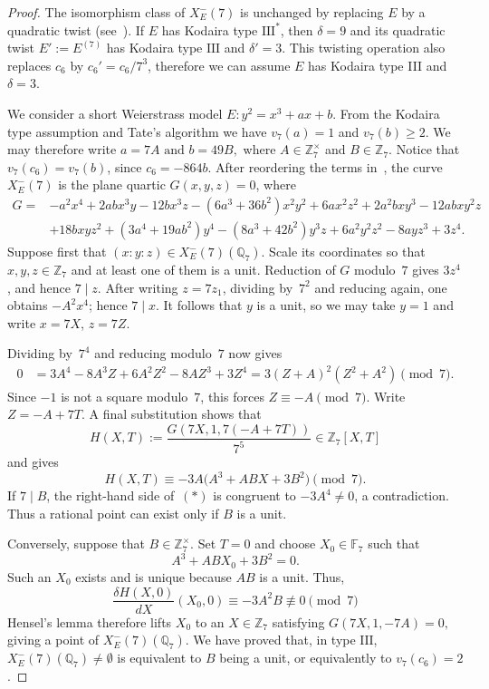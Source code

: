 \documentclass[12pt]{amsart}
\numberwithin{equation}{section}
\theoremstyle{definition}
\newcommand{\F}{\mathbb{F}}
\newcommand{\Q}{\mathbb{Q}}
\newcommand{\Z}{\mathbb{Z}}
\begin{document}
\begin{proof}
The isomorphism class of $X_E^-(7)$ is unchanged by replacing $E$ by a quadratic twist (see~\cite[\S4.5]{PSS}).  
If $E$ has Kodaira type $\mathrm{III}^*$, then $\delta=9$ and its quadratic twist $E' := E^{(7)}$ has Kodaira type $\mathrm{III}$ and $\delta' = 3$. This twisting operation also replaces $c_6$ by $c_6' = c_6/7^3$, therefore we can assume $E$ has Kodaira type III and $\delta = 3$.  

We consider a short Weierstrass model  
\(
 E:y^2=x^3+ax+b.
\)
From the Kodaira type assumption and Tate's algorithm we have $v_7(a)=1$ and $v_7(b)\geq2$.  We may therefore
write
\(
 a=7A\text{ and }b=49B,
 \)
where $A\in\Z_7^\times$ and $B\in\Z_7$.  Notice that
$v_7(c_6)=v_7(b)$, since $c_6=-864b$.
After reordering the terms in~\cite[(7.6)]{PSS}, the curve $X_E^-(7)$ is the plane
quartic $G(x,y,z)=0$, where
\begin{align*}
G={}&-a^2x^4+2abx^3y-12bx^3z-(6a^3+36b^2)x^2y^2
       +6ax^2z^2 +2a^2bxy^3-12abxy^2z\\
 & +18bxyz^2 +(3a^4+19ab^2)y^4 
 -(8a^3+42b^2)y^3z+6a^2y^2z^2-8ayz^3+3z^4.
\end{align*}
Suppose first that $(x:y:z)\in X_E^-(7)(\Q_7)$.  Scale its coordinates
so that $x,y,z\in\Z_7$ and at least one of them is a unit.  Reduction of
$G$ modulo~$7$ gives $3z^4$, and hence $7\mid z$.  After writing
$z=7z_1$, dividing by~$7^2$ and reducing again, one obtains
$-A^2x^4$; hence $7\mid x$.  It follows that $y$ is a unit, so we may
take $y=1$ and write $x=7X$, $z=7Z$.

Dividing by~$7^4$ and reducing modulo~$7$ now gives
\begin{align*}
0&=3A^4-8A^3Z+6A^2Z^2-8AZ^3+3Z^4=3(Z+A)^2(Z^2+A^2)\pmod 7.
\end{align*}
Since $-1$ is not a square modulo~$7$, this forces $Z\equiv-A\pmod7$.
Write $Z=-A+7T$.  A final substitution shows that
\[
 H(X,T):=\frac{G(7X,1,7(-A+7T))}{7^5}\in\Z_7[X,T]
\]
and gives
\[
 H(X,T)
 \equiv-3A\bigl(A^3+ABX+3B^2\bigr)\pmod7.                 \tag{*}
\]
If $7\mid B$, the right-hand side of~$(*)$ is congruent to
$-3A^4\ne0$, a contradiction.  Thus a rational point can exist only if
$B$ is a unit.

Conversely, suppose that $B\in\Z_7^\times$.  Set $T=0$ and choose
$X_0\in\F_7$ such that
\[
 A^3+ABX_0+3B^2=0.
\]
Such an $X_0$ exists and is unique because $AB$ is a unit.  Thus,
\[
\frac{\delta H(X,0)}{d X}(X_0,0)\equiv-3A^2B\not\equiv 0 \pmod 7
\]
Hensel's lemma therefore
lifts $X_0$ to an $X\in\Z_7$ satisfying
\(
 G(7X,1,-7A)=0,
\)
giving a point of $X_E^-(7)(\Q_7)$.  We have proved that, in type
$\mathrm{III}$, $X_E^-(7)(\Q_7)\ne \emptyset$ is equivalent to $B$ being a unit, or
equivalently to $v_7(c_6)=2$.
\end{proof}
\end{document}

